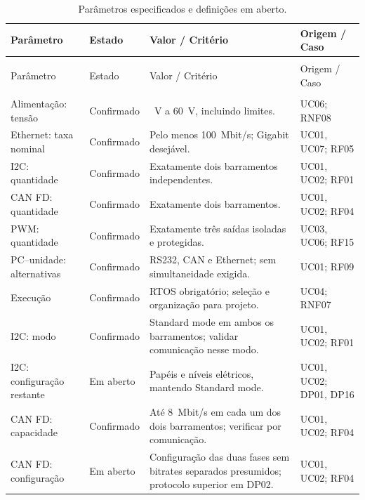 \begingroup
\small
{}
\setlength{\tabcolsep}{4pt}
\renewcommand{\arraystretch}{1.05}
\begin{longtable}{@{}>{\raggedright\arraybackslash}p{}>{\raggedright\arraybackslash}p{}>{\raggedright\arraybackslash}p{}>{\raggedright\arraybackslash}p{}@{}}
\caption{Parâmetros especificados e definições em aberto.}\label{tab:parametros-aceitacao}\\
\toprule
\rowcolor{LasetTint}
Parâmetro & Estado & Valor / Critério & Origem / Caso \\
\midrule
\endfirsthead
\multicolumn{4}{c}{\tablename~\thetable{} (continuação)}\\
\toprule
\rowcolor{LasetTint}
Parâmetro & Estado & Valor / Critério & Origem / Caso \\
\midrule
\endhead
\midrule
\multicolumn{4}{r}{Continua na página seguinte}\\
\endfoot
\bottomrule
\endlastfoot
Alimentação: tensão & Confirmado & 5~V a 60~V, incluindo limites. & UC06; RNF08 \\
Ethernet: taxa nominal & Confirmado & Pelo menos 100~Mbit/s; Gigabit desejável. & UC01, UC07; RF05 \\
I2C: quantidade & Confirmado & Exatamente dois barramentos independentes. & UC01, UC02; RF01 \\
CAN FD: quantidade & Confirmado & Exatamente dois barramentos. & UC01, UC02; RF04 \\
PWM: quantidade & Confirmado & Exatamente três saídas isoladas e protegidas. & UC03, UC06; RF15 \\
PC--unidade: alternativas & Confirmado & RS232, CAN e Ethernet; sem simultaneidade exigida. & UC01; RF09 \\
Execução & Confirmado & RTOS obrigatório; seleção e organização para projeto. & UC04; RNF07 \\
I2C: modo & Confirmado & Standard mode em ambos os barramentos; validar comunicação nesse modo. & UC01, UC02; RF01 \\
I2C: configuração restante & Em aberto & Papéis e níveis elétricos, mantendo Standard mode. & UC01, UC02; DP01, DP16 \\
CAN FD: capacidade & Confirmado & Até 8~Mbit/s em cada um dos dois barramentos; verificar por comunicação. & UC01, UC02; RF04 \\
CAN FD: configuração & Em aberto & Configuração das duas fases sem bitrates separados presumidos; protocolo superior em DP02. & UC01, UC02; RF04 \\

\end{longtable}
